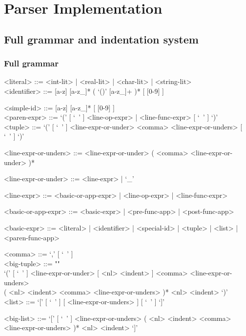\documentclass{article}
\begin{document}
\section{Parser Implementation}

\subsection{Full grammar and indentation system}

\subsubsection{Full grammar}

\begin{grammar}

<literal> ::= <int-lit> | <real-lit> | <char-lit> | <string-lit>
\\

<identifier> ::= [a-z] [a-z_]* ( `()' [a-z_]+ )* [ [0-9] ]

<simple-id> ::= [a-z] [a-z_]* [ [0-9] ]
\\

<paren-expr> ::= `(' [ `\ ' ] <line-op-expr> | <line-func-expr> [ `\ ' ] `)'  
\\

<tuple> ::=
`(' [ `\ ' ] <line-expr-or-under> <comma> <line-expr-or-unders> [ `\ ' ] `)'

<line-expr-or-unders> ::=
<line-expr-or-under> ( <comma> <line-expr-or-under> )*

<line-expr-or-under> ::= <line-expr> | `_'

<line-expr> ::= <basic-or-app-expr> | <line-op-expr> | <line-func-expr>

<basic-or-app-expr> ::= <basic-expr> | <pre-func-app> | <post-func-app>

<basic-expr> ::=
<literal> | <identifier> | <special-id> | <tuple> | <list> | <paren-func-app>

<comma> ::= `,' [ `\ ' ]
\\

<big-tuple> ::= ""\\
`(' [ `\ ' ] <line-expr-or-under> [ <nl> <indent> ]
<comma> <line-expr-or-unders> \\
( <nl> <indent> <comma> <line-expr-or-unders> )* 
<nl> <indent> `)'
\\

<list> ::= `[' [ `\ ' ] [ <line-expr-or-unders> ] [ `\ ' ] `]'

<big-list> ::= 
`[' [ `\ ' ] <line-expr-or-unders>
( <nl> <indent> <comma> <line-expr-or-unders> )* <nl> <indent> `]'
\\


\end{grammar}
\end{document}
